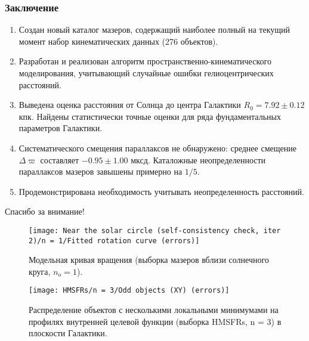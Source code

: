 \documentclass{beamer}
\begin{document}
\begin{frame}
\vspace{-0.6em}

\end{frame}

\begin{frame}
\frametitle{Заключение}
\begin{enumerate}
  \item Создан новый каталог мазеров, содержащий наиболее полный на текущий момент набор кинематических данных (276 объектов).
  \item Разработан и реализован алгоритм пространственно-кинематического моделирования, учитывающий случайные ошибки гелиоцентрических расстояний.
  \item Выведена оценка расстояния от Солнца до центра Галактики $ R_0 = 7.92 \pm 0.12 $ кпк. Найдены статистически точные оценки для ряда фундаментальных параметров Галактики.
  \item Систематического смещения параллаксов не обнаружено: среднее смещение $ \Delta\varpi $ составляет $ −0.95 \pm 1.00 $ мксд. Каталожные неопределенности параллаксов мазеров завышены примерно на $ 1/5 $.
  \item Продемонстрирована необходимость учитывать неопределенность расстояний.
\end{enumerate}
\end{frame}

\begin{frame}[plain]
\vspace{2em}
\centering\Huge
Спасибо за внимание!
\end{frame}

\begin{frame}
\vspace{-0.6em}

\end{frame}

\begin{frame}
\vspace{0.5em}
\begin{figure}
  \centering
  \texttt{[image: Near the solar circle (self-consistency check, iter 2)/n = 1/Fitted rotation curve (errors)]}
  \caption{Модельная кривая вращения (выборка мазеров вблизи солнечного круга, $ n_\mathrm{o} = 1 $).}
\end{figure}
\end{frame}

\begin{frame}
\vspace{0.5em}
\begin{figure}
  \centering
  \texttt{[image: HMSFRs/n = 3/Odd objects (XY) (errors)]}
  \caption{Распределение объектов с несколькими локальными минимумами на профилях внутренней целевой функции (выборка HMSFRs, n = 3) в плоскости Галактики.}
\end{figure}
\end{frame}
\end{document}

